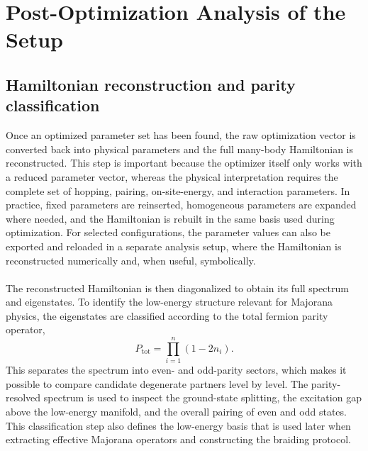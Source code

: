 \section{Post-Optimization Analysis of the Setup}
\subsection{Hamiltonian reconstruction and parity classification}
Once an optimized parameter set has been found, the raw optimization vector is converted back into physical parameters and the full many-body Hamiltonian is reconstructed. This step is important because the optimizer itself only works with a reduced parameter vector, whereas the physical interpretation requires the complete set of hopping, pairing, on-site-energy, and interaction parameters. In practice, fixed parameters are reinserted, homogeneous parameters are expanded where needed, and the Hamiltonian is rebuilt in the same basis used during optimization. For selected configurations, the parameter values can also be exported and reloaded in a separate analysis setup, where the Hamiltonian is reconstructed numerically and, when useful, symbolically. \\ \\
The reconstructed Hamiltonian is then diagonalized to obtain its full spectrum and eigenstates. To identify the low-energy structure relevant for Majorana physics, the eigenstates are classified according to the total fermion parity operator,
\[
P_{\mathrm{tot}} = \prod_{i=1}^{n} (1 - 2n_i).
\]
This separates the spectrum into even- and odd-parity sectors, which makes it possible to compare candidate degenerate partners level by level. The parity-resolved spectrum is used to inspect the ground-state splitting, the excitation gap above the low-energy manifold, and the overall pairing of even and odd states. This classification step also defines the low-energy basis that is used later when extracting effective Majorana operators and constructing the braiding protocol.
